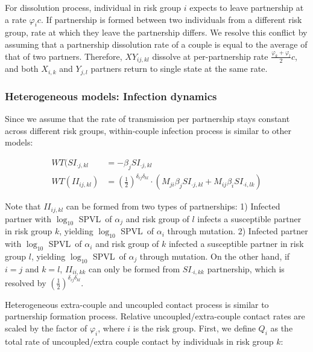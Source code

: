 \documentclass[10pt,letterpaper]{article}
\newcommand{\kkhalf}{\left(\frac{1}{2}\right)^{\delta_{ij} \delta_{kl}}}  %
\newcommand{\Lspvl}{$\log_{10}$ SPVL}
\begin{document}
For dissolution process, individual in risk group $i$ expects to leave partnership at a rate $\varphi_i c$. If partnership is formed between two individuals from a different risk group, rate at which they leave the partnership differs. We resolve this conflict by assuming that a partnership dissolution rate of a couple is equal to the average of that of two partners. Therefore, $XY_{ij, kl}$ dissolve at per-partnership rate $\frac{\varphi_k + \varphi_l}{2} c$, and both $X_{i,k}$ and $Y_{j,l}$ partners return to single state at the same rate.

\subsubsection*{Heterogeneous models: Infection dynamics}

Since we assume that the rate of transmission per partnership stays constant across different risk groups, within-couple infection process is similar to other models:

\begin{equation}
\begin{aligned}
WT(SI_{\cdot j, kl} &= - \beta_j SI_{\cdot j, kl}\\
WT(II_{ij, kl}) &= \kkhalf \cdot (M_{ji} \beta_j SI_{\cdot j, kl} + M_{ij} \beta_i SI_{\cdot i, lk})
\end{aligned}
\end{equation}

Note that $II_{ij,kl}$ can be formed from two types of partnerships: 1) Infected partner with \Lspvl\ of $\alpha_j$ and risk group of $l$ infects a susceptible partner in risk group $k$, yielding \Lspvl\ of $\alpha_i$ through mutation. 2) Infected partner with \Lspvl\ of $\alpha_i$ and risk group of $k$ infected a susceptible partner in risk group $l$, yielding \Lspvl\ of $\alpha_j$ through mutation. On the other hand, if $i = j$ and $k = l$, $II_{ii,kk}$ can only be formed from $SI_{\cdot i, kk}$ partnership, which is resolved by $\kkhalf$.

Heterogeneous extra-couple and uncoupled contact process is similar to partnership formation process. Relative uncoupled/extra-couple contact rates are scaled by the factor of $\varphi_i$, where $i$ is the risk group. First, we define $Q_{i}$ as the total rate of uncoupled/extra couple contact by individuals in risk group $k$:
\end{document}
